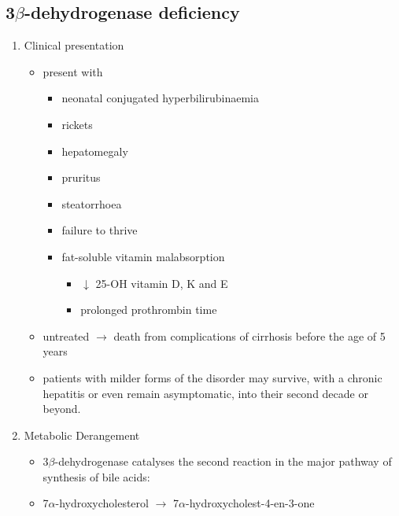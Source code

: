 \documentclass{scrartcl}
\begin{document}
\subsection{3\(\beta\)-dehydrogenase deficiency}
\label{sec:orga799b10}
\begin{enumerate}
\item Clinical presentation
\label{sec:orgcea7437}
\begin{itemize}
\item present with
\begin{itemize}
\item neonatal conjugated hyperbilirubinaemia
\item rickets
\item hepatomegaly
\item pruritus
\item steatorrhoea
\item failure to thrive
\item fat-soluble vitamin malabsorption
\begin{itemize}
\item \(\downarrow\) 25-OH vitamin D, K and E
\item prolonged prothrombin time
\end{itemize}
\end{itemize}

\item untreated \(\to\) death from complications of cirrhosis before the age
of 5 years
\item patients with milder forms of the disorder may survive, with a
chronic hepatitis or even remain asymptomatic, into their second
decade or beyond.
\end{itemize}



\item Metabolic Derangement
\label{sec:org0c77670}
\begin{itemize}
\item 3\(\beta\)-dehydrogenase catalyses the second reaction in the major
pathway of synthesis of bile acids:
\item 7\(\alpha\)-hydroxycholesterol \(\to\) 7\(\alpha\)-hydroxycholest-4-en-3-one


\end{itemize}
\end{enumerate}
\end{document}
